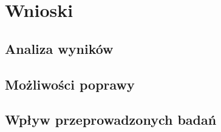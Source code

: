 


\section{Wnioski}

\subsection{Analiza wyników}

\subsection{Możliwości poprawy}

\subsection{Wpływ przeprowadzonych badań}